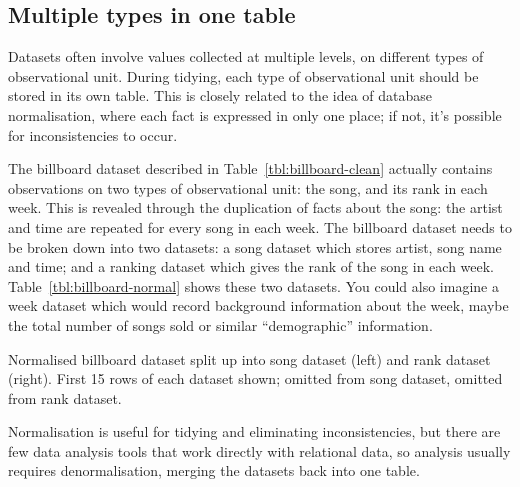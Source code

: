 \documentclass[article]{jss}
\begin{document}
\subsection{Multiple types in one table}
\label{sub:multiple-types}

Datasets often involve values collected at multiple levels, on different types of observational unit. During tidying, each type of observational unit should be stored in its own table. This is closely related to the idea of database normalisation, where each fact is expressed in only one place; if not, it's possible for inconsistencies to occur. 


The billboard dataset described in Table~\ref{tbl:billboard-clean} actually contains observations on two types of observational unit: the song, and its rank in each week. This is revealed through the duplication of facts about the song: the artist and time are repeated for every song in each week. The billboard dataset needs to be broken down into two datasets: a song dataset which stores artist, song name and time; and a ranking dataset which gives the rank of the song in each week. Table~\ref{tbl:billboard-normal} shows these two datasets. You could also imagine a week dataset which would record background information about the week, maybe the total number of songs sold or similar ``demographic'' information.

\begin{table}
  \centering
  \hspace{1em}%
  

  \caption{Normalised billboard dataset split up into song dataset (left) and rank dataset (right). First 15 rows of each dataset shown;  omitted from song dataset,  omitted from rank dataset.}
  \label{tbl:billboard-normal}
\end{table}

Normalisation is useful for tidying and eliminating inconsistencies, but there are few data analysis tools that work directly with relational data, so analysis usually requires denormalisation, merging the datasets back into one table. 
\end{document}
